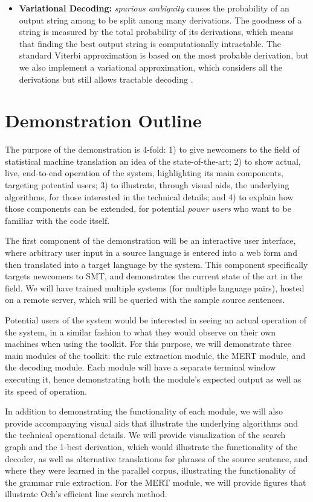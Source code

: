 \documentclass[11pt]{article}
\begin{document}
\begin{itemize}
\item \textbf{Variational Decoding:} \emph{spurious ambiguity} causes the probability of
an output string among to be split among many derivations.  The goodness
of a string is measured by the total probability of its derivations, which means
that finding the best output string is computationally intractable.
The standard Viterbi approximation is based on the most probable derivation, but
we also implement a variational approximation, which considers all the derivations
but still allows tractable decoding \cite{Li2009}.
\end{itemize}

\section{Demonstration Outline}

The purpose of the demonstration is 4-fold: 1) to give newcomers to the field
of statistical machine translation an idea of the state-of-the-art; 2) to show
actual, live, end-to-end operation of the system,
highlighting its main components, targeting potential users; 3) to illustrate,
through visual aids, the underlying algorithms, for those interested in the
technical details; and 4) to explain how those components can be extended, for
potential \emph{power users} who want to be familiar with the code itself.

The first component of the demonstration will be an interactive user interface,
where arbitrary user input in a source language is entered into a web form and
then translated into a target language by the system.  This component
specifically targets newcomers to SMT, and demonstrates the current state of
the art in the field.  We will have trained multiple systems (for multiple
language pairs), hosted on a remote server, which will be queried with the
sample source sentences.

Potential users of the system would be interested in seeing an actual operation
of the system, in a similar fashion to what they would observe on their own
machines when using the toolkit.  For this purpose, we will demonstrate three
main modules of the toolkit: the rule extraction module, the MERT module, and
the decoding module.  Each module will have a separate terminal window
executing it, hence demonstrating both the module's expected output as well as
its speed of operation.

In addition to demonstrating the functionality of each module, we will also
provide accompanying visual aids that illustrate the underlying algorithms and
the technical operational details.  We will provide visualization of the search
graph and the 1-best derivation, which would illustrate the functionality of
the decoder, as well as alternative translations for phrases of the source
sentence, and where they were learned in the parallel corpus, illustrating the
functionality of the grammar rule extraction.  For the MERT module, we will
provide figures that illustrate Och's efficient line search method.
\end{document}

